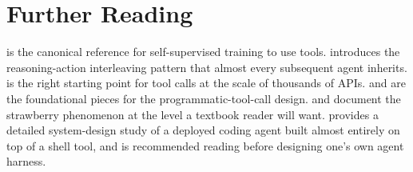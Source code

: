 \section*{Further Reading}

\citet{schick2023toolformer} is the canonical reference for
self-supervised training to use tools. \citet{yao2023react}
introduces the reasoning-action interleaving pattern that almost
every subsequent agent inherits. \citet{patil2023gorilla} is the
right starting point for tool calls at the scale of thousands of
APIs. \citet{wang2024codeact} and \citet{anthropic2025mcpcode} are
the foundational pieces for the programmatic-tool-call design.
\citet{fu2024counting} and \citet{xu2024geniusparadox} document the
strawberry phenomenon at the level a textbook reader will want.
\citet{liu2026claudecode} provides a detailed system-design study of
a deployed coding agent built almost entirely on top of a shell
tool, and is recommended reading before designing one's own agent
harness.
